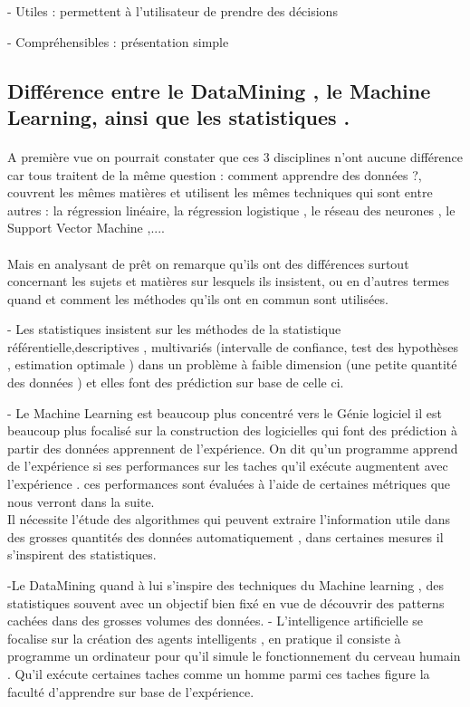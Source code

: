 -	Utiles :       permettent à l'utilisateur de prendre des décisions

-	Compréhensibles : présentation simple

\subsection{ {  Différence entre le DataMining , le Machine Learning, ainsi que les statistiques .} 
	\cite{differenceMLDM2} \cite{differenceMLDM} \cite{differenceMLDMStack}}
\paragraph{}
A première vue on pourrait constater que ces 3 disciplines n'ont aucune différence car tous traitent de la même question : comment apprendre des données ?, couvrent les mêmes matières et utilisent les mêmes techniques qui sont entre autres : la régression linéaire, la régression logistique  , le réseau des neurones , le Support Vector Machine ,....
\paragraph{} 
Mais en analysant de prêt on remarque qu'ils ont des différences surtout concernant les sujets et matières sur lesquels ils insistent, ou en d'autres termes quand et comment les méthodes qu'ils ont en commun sont utilisées.

- Les statistiques insistent sur les méthodes de la  statistique référentielle,descriptives , multivariés  (intervalle de confiance, test des hypothèses , estimation optimale )  dans un problème à faible dimension (une petite quantité des données ) et elles font des prédiction sur base de celle ci.\cite{differenceMLDM}

- Le Machine Learning est beaucoup plus concentré vers le Génie logiciel il est beaucoup plus focalisé sur la construction des logicielles qui font des prédiction à partir des données apprennent de l'expérience. On dit qu'un programme apprend de l'expérience si ses performances sur les taches qu'il exécute augmentent avec l'expérience . ces performances sont évaluées à l'aide de certaines métriques que nous verront dans la suite.\\
Il nécessite l'étude des algorithmes qui peuvent extraire l'information utile dans des grosses quantités des données automatiquement , dans certaines mesures il s'inspirent des statistiques. \cite{differenceMLDMStack}   

-Le DataMining quand à lui s'inspire des techniques du Machine learning , des statistiques souvent avec un objectif bien fixé en vue de découvrir des patterns cachées dans des grosses volumes des données.
- L'intelligence artificielle se focalise sur la création des agents intelligents , en pratique il consiste à programme un ordinateur pour qu'il simule le fonctionnement du cerveau humain . Qu'il exécute certaines taches comme un homme parmi ces taches figure la faculté d'apprendre sur base de l'expérience.
